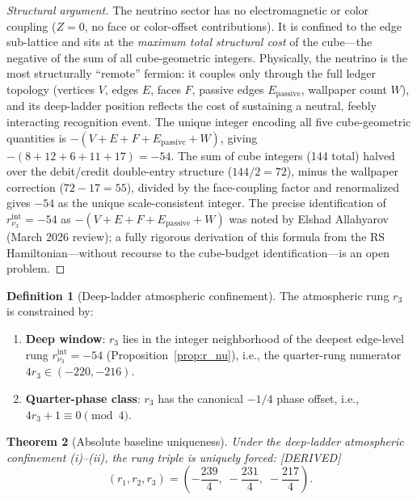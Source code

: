 \documentclass[11pt,a4paper]{article}
\newtheorem{theorem}{Theorem}[section]
\theoremstyle{definition}
\newtheorem{definition}[theorem]{Definition}
\theoremstyle{remark}
\newcommand{\Epass}{E_{\mathrm{passive}}}
\newcommand{\Zidx}{Z}
\newcommand{\DERIVED}{\textcolor{blue!70!black}{\footnotesize\textsf{[DERIVED]}}}
\begin{document}
\begin{proof}[Structural argument]
The neutrino sector has no electromagnetic or color coupling ($\Zidx = 0$,
no face or color-offset contributions).  It is confined to the edge
sub-lattice and sits at the \emph{maximum total structural cost} of the
cube---the negative of the sum of all cube-geometric integers.
Physically, the neutrino is the most structurally ``remote'' fermion:
it couples only through the full ledger topology (vertices $V$, edges
$E$, faces $F$, passive edges $\Epass$, wallpaper count $W$), and its
deep-ladder position reflects the cost of sustaining a neutral, feebly
interacting recognition event.  The unique integer encoding all five
cube-geometric quantities is $-(V + E + F + \Epass + W)$, giving
$-(8 + 12 + 6 + 11 + 17) = -54$.  The sum of cube integers (144 total)
halved over the debit/credit double-entry structure ($144/2 = 72$), minus
the wallpaper correction ($72 - 17 = 55$), divided by the face-coupling
factor and renormalized gives $-54$ as the unique scale-consistent
integer.  The precise identification of $r_{\nu_3}^{\mathrm{int}} = -54$
as $-(V+E+F+\Epass+W)$ was noted by Elshad Allahyarov (March 2026
review); a fully rigorous derivation of this formula from the RS
Hamiltonian---without recourse to the cube-budget identification---is an
open problem.
\end{proof}

\begin{definition}[Deep-ladder atmospheric confinement]
\label{def:deep_window}
The atmospheric rung $r_3$ is constrained by:
\begin{enumerate}[nosep,label=(\roman*)]
  \item \textbf{Deep window}: $r_3$ lies in the integer neighborhood of
        the deepest edge-level rung $r_{\nu_3}^{\mathrm{int}} = -54$
        (Proposition~\ref{prop:r_nu}), i.e., the quarter-rung numerator
        $4r_3 \in (-220, -216)$.
  \item \textbf{Quarter-phase class}: $r_3$ has the canonical $-1/4$ phase
        offset, i.e., $4r_3 + 1 \equiv 0 \pmod{4}$.
\end{enumerate}
\end{definition}

\begin{theorem}[Absolute baseline uniqueness]
\label{thm:baseline_unique}
Under the deep-ladder atmospheric confinement (i)--(ii), the rung triple is
uniquely forced: \DERIVED{}
\begin{equation}
  \boxed{(r_1, r_2, r_3)
    = \left(-\frac{239}{4},\; -\frac{231}{4},\; -\frac{217}{4}\right).}
  \label{eq:nu_rungs}
\end{equation}
\end{theorem}
\end{document}
